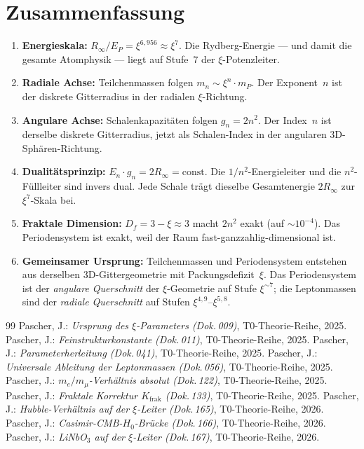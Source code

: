 \section{Zusammenfassung}
\label{sec:ps-zusammenfassung}

\begin{enumerate}
  \item \textbf{Energieskala:} $R_\infty / E_P = \xi^{6{,}956} \approx \xi^7$.
    Die Rydberg-Energie — und damit die gesamte Atomphysik — liegt auf
    Stufe~7 der $\xi$-Potenzleiter.

  \item \textbf{Radiale Achse:} Teilchenmassen folgen $m_n \sim \xi^{n} \cdot m_P$.
    Der Exponent~$n$ ist der diskrete Gitterradius in der radialen $\xi$-Richtung.

  \item \textbf{Angulare Achse:} Schalenkapazitäten folgen $g_n = 2n^2$.
    Der Index~$n$ ist derselbe diskrete Gitterradius, jetzt als Schalen-Index
    in der angularen 3D-Sphären-Richtung.

  \item \textbf{Dualitätsprinzip:} $E_n \cdot g_n = 2R_\infty = \text{const}$.
    Die $1/n^2$-Energieleiter und die $n^2$-Füllleiter sind invers dual.
    Jede Schale trägt dieselbe Gesamtenergie $2R_\infty$ zur $\xi^7$-Skala bei.

  \item \textbf{Fraktale Dimension:} $D_f = 3 - \xi \approx 3$ macht $2n^2$ exakt
    (auf $\sim 10^{-4}$). Das Periodensystem ist exakt, weil der Raum
    fast-ganzzahlig-dimensional ist.

  \item \textbf{Gemeinsamer Ursprung:} Teilchenmassen und Periodensystem
    entstehen aus derselben 3D-Gittergeometrie mit Packungsdefizit~$\xi$.
    Das Periodensystem ist der \emph{angulare Querschnitt} der $\xi$-Geometrie
    auf Stufe $\xi^{\sim 7}$; die Leptonmassen sind der \emph{radiale Querschnitt}
    auf Stufen $\xi^{4{,}9}$–$\xi^{5{,}8}$.
\end{enumerate}

\begin{thebibliography}{99}
 Pascher, J.: \emph{Ursprung des $\xi$-Parameters (Dok.\,009)},
  T0-Theorie-Reihe, 2025.
 Pascher, J.: \emph{Feinstrukturkonstante (Dok.\,011)},
  T0-Theorie-Reihe, 2025.
 Pascher, J.: \emph{Parameterherleitung (Dok.\,041)},
  T0-Theorie-Reihe, 2025.
 Pascher, J.: \emph{Universale Ableitung der Leptonmassen (Dok.\,056)},
  T0-Theorie-Reihe, 2025.
 Pascher, J.: \emph{$m_e/m_\mu$-Verhältnis absolut (Dok.\,122)},
  T0-Theorie-Reihe, 2025.
 Pascher, J.: \emph{Fraktale Korrektur $K_\text{frak}$ (Dok.\,133)},
  T0-Theorie-Reihe, 2025.
 Pascher, J.: \emph{Hubble-Verhältnis auf der $\xi$-Leiter (Dok.\,165)},
  T0-Theorie-Reihe, 2026.
 Pascher, J.: \emph{Casimir-CMB-$H_0$-Brücke (Dok.\,166)},
  T0-Theorie-Reihe, 2026.
 Pascher, J.: \emph{LiNbO$_3$ auf der $\xi$-Leiter (Dok.\,167)},
  T0-Theorie-Reihe, 2026.
\end{thebibliography}

